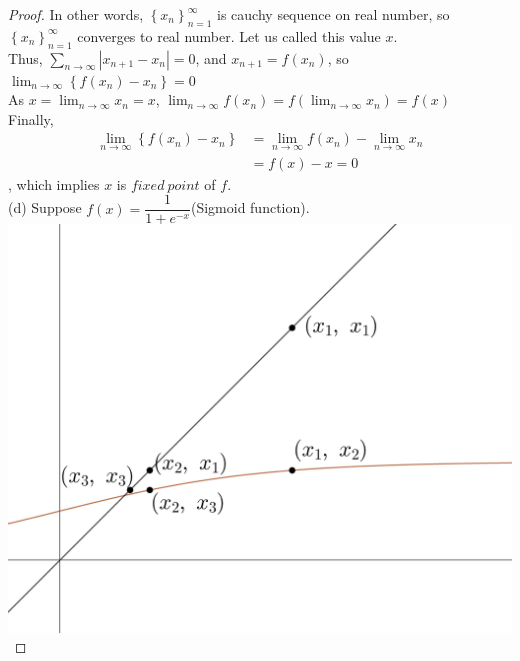 \documentclass[12pt]{book}
\theoremstyle{definition}
\begin{document}
\begin{spacing}{1.0}
\begin{proof}
				In other words, $\left\{x_n\right\}_{n=1}^\infty$ is cauchy sequence on real number, so $\left\{x_n\right\}_{n=1}^\infty$ converges to real number. Let us called this value $x$.\\
				Thus, $\displaystyle\sum_{n\rightarrow\infty} |x_{n+1}-x_n|=0$, and $x_{n+1}=f(x_n)$, so $\displaystyle\lim_{n\rightarrow \infty} \left\{f(x_n)-x_n\right\}=0$\\
				As $x=\displaystyle\lim_{n\rightarrow \infty} x_n=x$, $\displaystyle\lim_{n\rightarrow \infty} f(x_n)=f\left(\displaystyle\lim_{n\rightarrow\infty} x_n\right)=f(x)$\\
				Finally,
				\begin{align*}
					\displaystyle\lim_{n\rightarrow \infty} \left\{f(x_{n})-x_n\right\}&=\displaystyle\lim_{n\rightarrow \infty} f(x_n)-\displaystyle\lim_{n\rightarrow\infty}x_n\\
					&=f(x)-x=0
				\end{align*}
				, which implies $x$ is $fixed~point$ of $f$.\\
				\newpage
				\noindent (d) Suppose $f(x)=\dfrac{1}{1+e^{-x}}$(Sigmoid function).\\
				\includegraphics[width=\textwidth]{5_22.png}
			\end{proof}
		\end{spacing}
\end{document}
